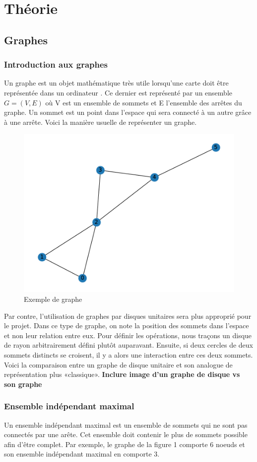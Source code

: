 \documentclass[11pt]{article}
\begin{document}
\section{Théorie}
\subsection{Graphes}
\subsubsection{Introduction aux graphes}
Un graphe est un objet mathématique très utile lorsqu'une carte doit être représentée dans un ordinateur \cite{mackaness_use_1993}\cite{riaz_applications_2011}. Ce dernier est représenté par un ensemble $G=(V,E)$ où V est un ensemble de sommets et E l'ensemble des arrêtes du graphe. Un sommet est un point dans l'espace qui sera connecté à un autre grâce à une arrête. Voici la manière usuelle de représenter un graphe.

\begin{figure}[H]
    \centering
        \includegraphics[width=0.45\linewidth]{images/graphe_MIS_exemple.pdf}
        \caption{Exemple de graphe}
    \label{graph_exemple}
\end{figure}

Par contre, l'utilisation de graphes par disques unitaires sera plus approprié pour le projet. Dans ce type de graphe, on note la position des sommets dans l'espace et non leur relation entre eux. Pour définir les opérations, nous traçons un disque de rayon arbitrairement défini plutôt auparavant. Ensuite, si deux cercles de deux sommets distincts se croisent, il y a alors une interaction entre ces deux sommets. Voici la comparaison entre un graphe de disque unitaire et son analogue de représentation plus «classique».  \textbf{Inclure image d'un graphe de disque vs son graphe}

\subsubsection{Ensemble indépendant maximal}
Un ensemble indépendant maximal est un ensemble de sommets qui ne sont pas connectés par une arête. Cet ensemble doit contenir le plus de sommets possible afin d'être complet. Par exemple, le graphe de la figure 1 comporte 6 noeuds et son ensemble indépendant maximal en comporte 3.
 
\end{document}
